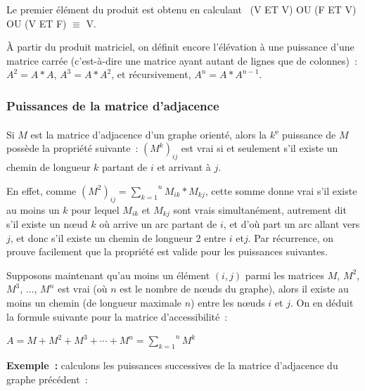 			Le premier élément du produit est obtenu en calculant \
			(V ET V) OU (F ET V) OU (V ET F) ${\equiv}$ V.

			À partir du produit matriciel, on définit encore l'élévation 
			à une puissance d'une matrice carrée (c'est-à-dire une
			matrice ayant autant de lignes que de colonnes)~: 
			$A^2 = A*A$, $A^3 = A*A^2$, et récursivement, $A^n = A*A^{n-1}$.
			
		\subsubsection{Puissances de la matrice d'adjacence}

			Si $M$ est la matrice d'adjacence d'un graphe orienté, 
			alors la $k$\textsuperscript{e} puissance de
			$M$ possède la propriété suivante~: 
			$(M^k)_{ij}$ est vrai si et seulement s'il existe un chemin de 
			longueur $k$ partant de $i$ et arrivant à $j$.

			En effet, comme $(M^2)_{ij}=\overset n{\underset{k=1}\sum} M_{ik}\ast M_{kj}$, 
			cette somme donne vrai s'il existe au moins un $k$ pour lequel $M_{ik}$ et
			$M_{kj}$ sont vrais simultanément, autrement dit s'il existe un n{\oe}ud
			$k$ où arrive un arc partant de $i$, et d'où part un arc allant vers
			$j$, et donc s'il existe un chemin de longueur 2 entre $i$ et$j$. 
			Par récurrence, on prouve facilement que la propriété
			est valide pour les puissances suivantes.

			Supposons maintenant qu'au moins un élément $(i, j)$ 
			parmi les matrices $M$, $M^2$, $M^3$, ..., $M^n$ est vrai
			(où $n$ est le nombre de n{\oe}uds du graphe), 
			alors il existe au moins un chemin (de longueur maximale $n$) 
			entre les n{\oe}uds $i$ et $j$. On en déduit la formule suivante 
			pour la matrice	d'accessibilité~:

			\begin{center}
			$A=M+M^2+M^3+\cdots +M^n=\overset n{\underset{k=1}{\sum }}M^k$
			\end{center}
			
			\textbf{Exemple~:} calculons les puissances successives 
			de la matrice d'adjacence du graphe précédent~:


